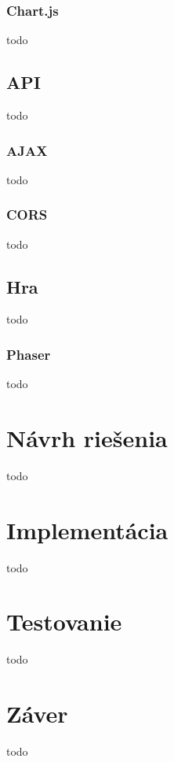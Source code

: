 \subsection{Chart.js}
todo

\section{API}
todo

\subsection{AJAX}
todo

\subsection{CORS}
todo

\section{Hra}
todo

\subsection{Phaser}
todo

\chapter{Návrh riešenia}
todo

\chapter{Implementácia}
todo

\chapter{Testovanie}
todo

\chapter{Záver}
todo












